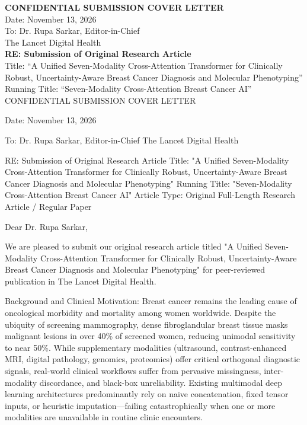 \documentclass[11pt]{article}
\begin{document}
\noindent\textbf{CONFIDENTIAL SUBMISSION COVER LETTER}\\
\noindent Date: November 13, 2026\\
\noindent To: Dr. Rupa Sarkar, Editor-in-Chief\\
\noindent The Lancet Digital Health\\
\vspace{0.5cm}
\noindent\textbf{RE: Submission of Original Research Article}\\
\noindent Title: ``A Unified Seven-Modality Cross-Attention Transformer for Clinically Robust, Uncertainty-Aware Breast Cancer Diagnosis and Molecular Phenotyping''\\
\noindent Running Title: ``Seven-Modality Cross-Attention Breast Cancer AI''\\
\vspace{0.5cm}
CONFIDENTIAL SUBMISSION COVER LETTER

Date: November 13, 2026

To:
Dr. Rupa Sarkar, Editor-in-Chief
The Lancet Digital Health

RE: Submission of Original Research Article
Title: "A Unified Seven-Modality Cross-Attention Transformer for Clinically Robust, Uncertainty-Aware Breast Cancer Diagnosis and Molecular Phenotyping"
Running Title: "Seven-Modality Cross-Attention Breast Cancer AI"
Article Type: Original Full-Length Research Article / Regular Paper

Dear Dr. Rupa Sarkar,

We are pleased to submit our original research article titled "A Unified Seven-Modality Cross-Attention Transformer for Clinically Robust, Uncertainty-Aware Breast Cancer Diagnosis and Molecular Phenotyping" for peer-reviewed publication in The Lancet Digital Health.

Background and Clinical Motivation:
Breast cancer remains the leading cause of oncological morbidity and mortality among women worldwide. Despite the ubiquity of screening mammography, dense fibroglandular breast tissue masks malignant lesions in over 40\% of screened women, reducing unimodal sensitivity to near 50\%. While supplementary modalities (ultrasound, contrast-enhanced MRI, digital pathology, genomics, proteomics) offer critical orthogonal diagnostic signals, real-world clinical workflows suffer from pervasive missingness, inter-modality discordance, and black-box unreliability. Existing multimodal deep learning architectures predominantly rely on naive concatenation, fixed tensor inputs, or heuristic imputation—failing catastrophically when one or more modalities are unavailable in routine clinic encounters.
\end{document}
